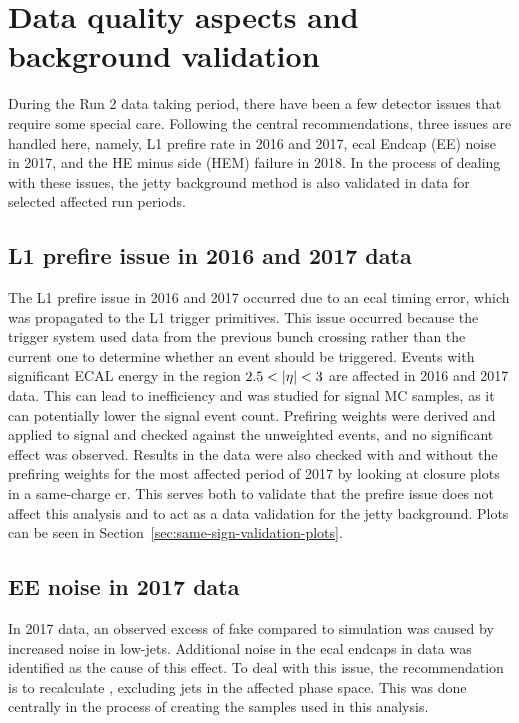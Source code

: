 \clearpage
\section{Data quality aspects and background validation}
\label{sec:data-quality}

During the Run 2 data taking period, there have been a few detector issues that require some special care. Following the central recommendations, three issues are handled here, namely, L1 prefire rate in 2016 and 2017, \gls{ecal} Endcap (EE) noise in 2017, and the HE minus side (HEM) failure in 2018. In the process of dealing with these issues, the jetty background method is also validated in data for selected affected run periods. 

\subsection{L1 prefire issue in 2016 and 2017 data}

The L1 prefire issue in 2016 and 2017 occurred due to an \gls{ecal} timing error, which was propagated to the L1 trigger primitives. This issue occurred because the trigger system used data from the previous bunch crossing rather than the current one to determine whether an event should be triggered. Events with significant ECAL energy in the region $2.5<\lvert \eta \rvert<3$ are affected in 2016 and 2017 data. This can lead to inefficiency and was studied for signal MC samples, as it can potentially lower the signal event count. Prefiring weights were derived and applied to signal and checked against the unweighted events, and no significant effect was observed. Results in the data were also checked with and without the prefiring weights for the most affected period of 2017 by looking at closure plots in a same-charge \gls{cr}. This serves both to validate that the prefire issue does not affect this analysis and to act as a data validation for the jetty background. Plots can be seen in Section~\ref{sec:same-sign-validation-plots}.

\subsection{EE noise in 2017 data}

In 2017 data, an observed excess of fake \ptmiss compared to simulation was caused by increased noise in low-\pt jets. Additional noise in the \gls{ecal} endcaps in data was identified as the cause of this effect. To deal with this issue, the recommendation is to recalculate \ptmiss, excluding jets in the affected phase space. This was done centrally in the process of creating the samples used in this analysis.

